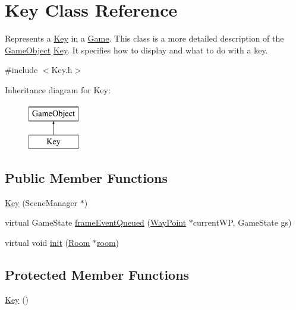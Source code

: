 \hypertarget{classKey}{\section{\-Key \-Class \-Reference}
\label{classKey}
}


\-Represents a \hyperlink{classKey}{\-Key} in a \hyperlink{classGame}{\-Game}. \-This class is a more detailed description of the \hyperlink{classGameObject}{\-Game\-Object} \hyperlink{classKey}{\-Key}. \-It specifies how to display and what to do with a key.  




{\ttfamily \#include $<$\-Key.\-h$>$}

\-Inheritance diagram for \-Key\-:\begin{figure}[H]
\begin{center}
\leavevmode
\includegraphics[height=2.000000cm]{classKey}
\end{center}
\end{figure}
\subsection*{\-Public \-Member \-Functions}
\begin{DoxyCompactItemize}
\item 
\hyperlink{classKey_ae07b933c3599eb3d74eb1b61f91066fb}{\-Key} (\-Scene\-Manager $\ast$)
\item 
virtual \-Game\-State \hyperlink{classKey_a0ed28ed2112095183608b764e4453f9b}{frame\-Event\-Queued} (\hyperlink{classWayPoint}{\-Way\-Point} $\ast$current\-W\-P, \-Game\-State gs)
\item 
virtual void \hyperlink{classKey_a2c7e2bc5cc7099a52676ec8885142fde}{init} (\hyperlink{classRoom}{\-Room} $\ast$\hyperlink{classGameObject_a9f63419cc03f2513f757a317a2e37557}{room})
\end{DoxyCompactItemize}
\subsection*{\-Protected \-Member \-Functions}
\begin{DoxyCompactItemize}
\item 
\hyperlink{classKey_a22e51dbebb18c1d33ee8bba93a1b3b4d}{\-Key} ()
\end{DoxyCompactItemize}
